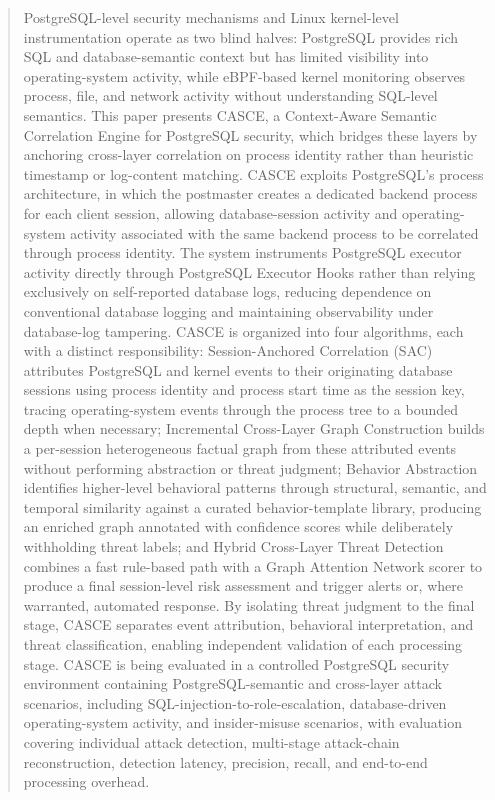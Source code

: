 \documentclass[conference]{IEEEtran}
\begin{document}
\begin{abstract}
PostgreSQL-level security mechanisms and Linux kernel-level instrumentation operate as two blind halves: PostgreSQL provides rich SQL and database-semantic context but has limited visibility into operating-system activity, while eBPF-based kernel monitoring observes process, file, and network activity without understanding SQL-level semantics. This paper presents CASCE, a Context-Aware Semantic Correlation Engine for PostgreSQL security, which bridges these layers by anchoring cross-layer correlation on process identity rather than heuristic timestamp or log-content matching. CASCE exploits PostgreSQL's process architecture, in which the postmaster creates a dedicated backend process for each client session, allowing database-session activity and operating-system activity associated with the same backend process to be correlated through process identity. The system instruments PostgreSQL executor activity directly through PostgreSQL Executor Hooks rather than relying exclusively on self-reported database logs, reducing dependence on conventional database logging and maintaining observability under database-log tampering. CASCE is organized into four algorithms, each with a distinct responsibility: Session-Anchored Correlation (SAC) attributes PostgreSQL and kernel events to their originating database sessions using process identity and process start time as the session key, tracing operating-system events through the process tree to a bounded depth when necessary; Incremental Cross-Layer Graph Construction builds a per-session heterogeneous factual graph from these attributed events without performing abstraction or threat judgment; Behavior Abstraction identifies higher-level behavioral patterns through structural, semantic, and temporal similarity against a curated behavior-template library, producing an enriched graph annotated with confidence scores while deliberately withholding threat labels; and Hybrid Cross-Layer Threat Detection combines a fast rule-based path with a Graph Attention Network scorer to produce a final session-level risk assessment and trigger alerts or, where warranted, automated response. By isolating threat judgment to the final stage, CASCE separates event attribution, behavioral interpretation, and threat classification, enabling independent validation of each processing stage. CASCE is being evaluated in a controlled PostgreSQL security environment containing PostgreSQL-semantic and cross-layer attack scenarios, including SQL-injection-to-role-escalation, database-driven operating-system activity, and insider-misuse scenarios, with evaluation covering individual attack detection, multi-stage attack-chain reconstruction, detection latency, precision, recall, and end-to-end processing overhead.
\end{abstract}
\end{document}
